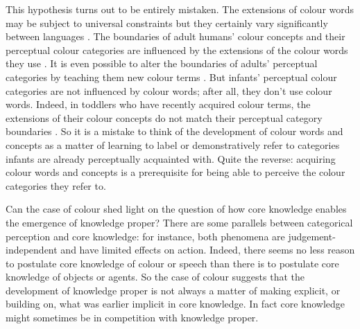 \documentclass[12pt,\papersize]{extarticle}
\begin{document}
This hypothesis turns out to be entirely mistaken. 
The extensions of colour words may be subject to universal constraints but they certainly vary significantly between languages  \citep{kay:2003_resolving}.
The boundaries of adult humans' colour concepts and their perceptual colour categories  are influenced by the extensions of the colour words they use \citep{Kay:2006ly,Roberson:2007wg,Winawer:2007im}. 
It is even possible to alter the boundaries of adults' perceptual categories by teaching them new colour terms
\citep{Ozgen:2002yk}. 
But infants' perceptual colour categories are not influenced by colour words; after all, they don't use colour words. 
Indeed, in toddlers who have recently acquired colour terms, the extensions of their colour concepts do not match their perceptual category boundaries \citep{Franklin:2005hp}. 
So it is a mistake to think of the development of colour words and concepts as a matter of learning to label or demonstratively refer to categories infants are already perceptually acquainted with. 
Quite the reverse: acquiring colour words and concepts is a prerequisite for being able to perceive the colour categories they refer to.


Can the case of colour shed light on the question of how core knowledge enables the emergence of knowledge proper?
There are some parallels between categorical perception and core knowledge: for instance, both phenomena are judgement-independent and have limited effects on action. 
Indeed, there seems no less reason to postulate core knowledge of colour or speech than there is to postulate core knowledge of objects or agents. 
So the case of colour suggests that the development of knowledge proper is not always a matter of making explicit, or building on, what was earlier implicit in core knowledge. 
In fact core knowledge might sometimes be in competition with knowledge proper. 
\end{document}
